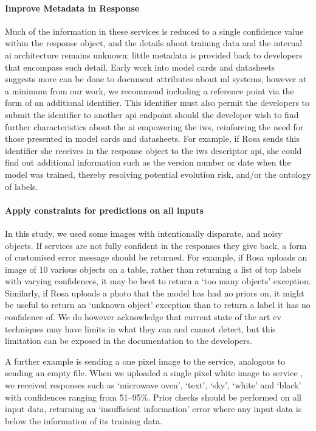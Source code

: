 \paragraph{Improve Metadata in Response}
Much of the information in these services is reduced to a single confidence value within the response object, and the details about training data and the internal \gls{ai} architecture remains unknown; little metadata is provided back to developers that encompass such detail. Early work into model cards and datasheets~\citep{Mitchell:2018in,Gebru:2018wh} suggests more can be done to document attributes about \gls{ml} systems, however at a minimum from our work, we recommend including a reference point via the form of an additional identifier. This identifier must also permit the developers to submit the identifier to another \gls{api} endpoint should the developer wish to find further characteristics about the \gls{ai} empowering the \gls{iws}, reinforcing the need for those presented in model cards and datasheets. For example, if Rosa sends this identifier she receives in the response object to the \gls{iws} descriptor \gls{api}, she could find out additional information such as the version number or date when the model was trained, thereby resolving potential evolution risk, and/or the ontology of labels.
 
\paragraph{Apply constraints for predictions on all inputs}
In this study, we used some images with intentionally disparate, and noisy objects. If services are not fully confident in the responses they  give back, a form of customised error message should be returned. For example, if Rosa uploads an image of 10 various objects on a table, rather than returning a list of top labels with varying confidences, it may be best to return a `too many objects' exception. Similarly, if Rosa uploads a photo that the model has had no priors on, it might be useful to return an `unknown object' exception than to return a label it has no confidence of. We do however acknowledge that current state of the art \gls{cv} techniques may have limits in what they can and cannot detect, but this limitation can be exposed in the documentation to the developers.

A further example is sending a one pixel image to the service, analogous to sending an empty file. When we uploaded a single pixel white image to service \googleapi{}, we received responses such as `microwave oven', `text', `sky', `white' and `black' with confidences ranging from 51--95\%. Prior checks should be performed on all input data, returning an `insufficient information' error where any input data is below the information of its training data.
 
